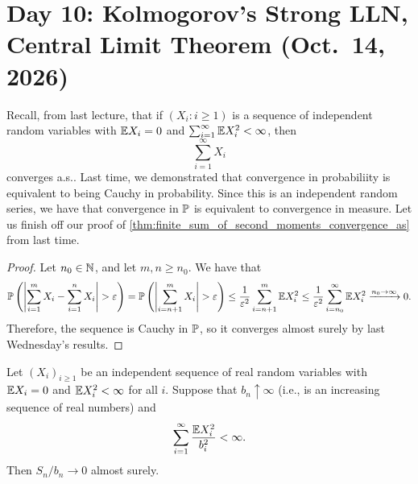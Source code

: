 \section{Day 10: Kolmogorov's Strong LLN, Central Limit Theorem (Oct.\ 14, 2026)}
Recall, from last lecture, that if $(X_i : i \geq 1)$ is a sequence of independent random variables with $\mathbb E X_i = 0$ and $\sum_{i=1}^\infty \mathbb E X_i^2 < \infty$, then
\[ \sum_{i=1}^\infty X_i \]
converges a.s.. Last time, we demonstrated that convergence in probabiliity is equivalent to being Cauchy in probability. Since this is an independent random series, we have that convergence in $\mathbb P$ is equivalent to convergence in measure. Let us finish off our proof of \ref{thm:finite_sum_of_second_moments_convergence_as} from last time.
\begin{proof}
    Let $n_0 \in \mathbb N$, and let $m, n \geq n_0$. We have that
    \[ \mathbb P\left(\left\lvert \sum_{i=1}^m X_i - \sum_{i=1}^n X_i \right\rvert > \varepsilon\right) = \mathbb P\left(\left\lvert \sum_{i=n+1}^m X_i \right\rvert > \varepsilon\right) \leq \frac{1}{\varepsilon^2} \sum_{i=n+1}^m \mathbb E X_i^2 \leq \frac{1}{\varepsilon^2} \sum_{i=n_0}^\infty \mathbb E X_i^2 \xrightarrow{n_0 \to \infty} 0. \]
    Therefore, the sequence is Cauchy in $\mathbb P$, so it converges almost surely by last Wednesday's results.
\end{proof}

\begin{theorem} \label{thm:kolmogorov_slln}
    Let $(X_i)_{i \geq 1}$ be an independent sequence of real random variables with $\mathbb E X_i = 0$ and $\mathbb E X_i^2 < \infty$ for all $i$. Suppose that $b_n \uparrow \infty$ (i.e., is an increasing sequence of real numbers) and
    \[ \sum_{i=1}^\infty \frac{\mathbb E X_i^2}{b_i^2} < \infty. \]
    Then $S_n/b_n \to 0$ almost surely.
\end{theorem}

